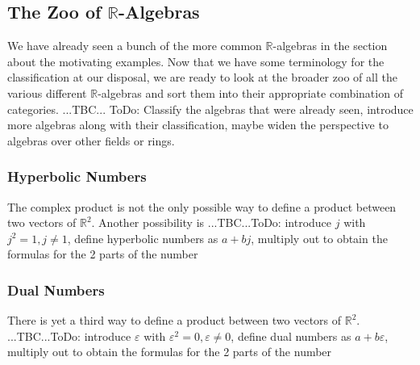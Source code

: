 






\subsection{The Zoo of $\mathbb{R}$-Algebras}
We have already seen a bunch of the more common $\mathbb{R}$-algebras in the section about the motivating examples. Now that we have some terminology for the classification at our disposal, we are ready to look at the broader zoo of all the various different $\mathbb{R}$-algebras and sort them into their appropriate combination of categories. ...TBC... ToDo: Classify the algebras that were already seen, introduce more algebras along with their classification, maybe widen the perspective to algebras over other fields or rings.


\subsubsection{Hyperbolic Numbers}
The complex product is not the only possible way to define a product between two vectors of $\mathbb{R}^2$. Another possibility is ...TBC...ToDo: introduce $j$ with $j^2 = 1, j \neq 1$, define hyperbolic numbers as $a + b j$, multiply out to obtain the formulas for the 2 parts of the number



\subsubsection{Dual Numbers}
There is yet a third way to define a product between two vectors of $\mathbb{R}^2$. ...TBC...ToDo: introduce $\varepsilon$ with $\varepsilon^2 = 0, \varepsilon \neq 0$, define dual numbers as $a + b \varepsilon$, multiply out to obtain the formulas for the 2 parts of the number

